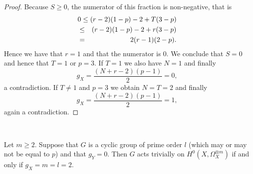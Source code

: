 \begin{proof}
    Because $S \geq 0$, the numerator of this fraction is non-negative, that is
      \begin{eqnarray*}
	\lefteqn{0 \le (r-2)(1-p) - 2 + T (3-p)}\\
	&\le & (r-2)(1-p) - 2 + r (3-p)\\
	&=& 2 (r-1)(2-p).
      \end{eqnarray*}
    Hence we have that $r=1$ and that the numerator is $0$. 
    We conclude that $S=0$ and hence that $T=1$ or $p=3$. 
    If $T=1$ we also have $N=1$ and finally
      \[
	g_X = \frac{(N+r-2)(p-1)}{2} = 0,
      \]
	a contradiction.
    If $T \not=1$ and $p=3$ we obtain $N=T=2$ and finally 
      \[
	g_X = \frac{(N+r-2)(p-1)}{2} =1,
      \] 
  again a contradiction.
  \end{proof}
~
  \begin{prop}\label{triv}
    Let $m \geq 2$. 
    Suppose that $G$ is a cyclic group of prime order $l$ (which may or may not be equal to $p$) and that $g_Y=0$. 
    Then $G$ acts trivially on $H^0(X,\Omega_X^{\otimes m})$ if and only if $g_X=m=l=2$.
  \end{prop}
